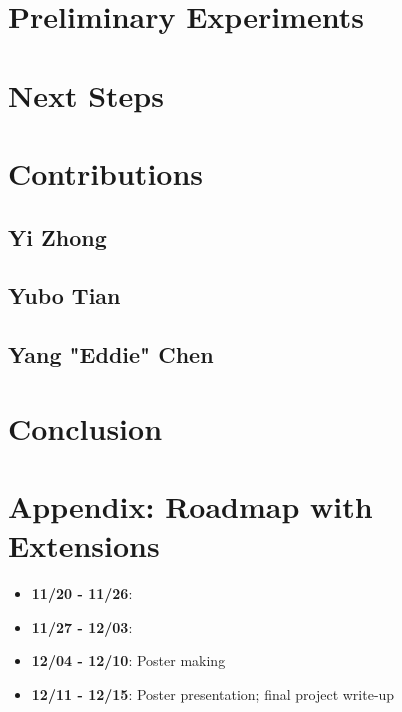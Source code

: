 \documentclass[paper=a4, fontsize=11pt]{scrartcl} %
\numberwithin{equation}{section} %
\numberwithin{figure}{section} %
\numberwithin{table}{section} %
\begin{document}


\section{Preliminary Experiments}



\section{Next Steps}


\section{Contributions}
\subsection{Yi Zhong}
\subsection{Yubo Tian}
\subsection{Yang "Eddie" Chen}


\section{Conclusion}

\appendix
\section{Appendix: Roadmap with Extensions}
\begin{itemize}
\item \textbf{11/20 - 11/26}: 
\item \textbf{11/27 - 12/03}: 
\item \textbf{12/04 - 12/10}: Poster making
\item \textbf{12/11 - 12/15}: Poster presentation; final project write-up
\end{itemize}
\end{document}
